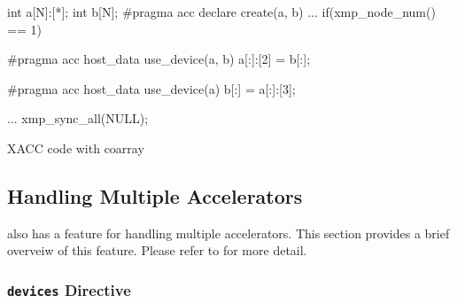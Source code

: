 \begin{myfigure}
\begin{minipage}{0.45\hsize}
\begin{center}
\end{center}
\end{minipage}
%
\begin{minipage}{0.53\hsize}
\begin{center}
\begin{XACCCexampleR}
int a[N]:[*];
int b[N];
#pragma acc declare create(a, b)
...
if(xmp_node_num() == 1){
#pragma acc host_data use_device(a, b)
  a[:]:[2] = b[:];

#pragma acc host_data use_device(a)
  b[:] = a[:]:[3];
}
...
xmp_sync_all(NULL);
\end{XACCCexampleR}
\end{center}
\end{minipage}
\caption{XACC code with coarray}\label{code:coarray}
\end{myfigure}



\subsection{Handling Multiple Accelerators}

{\XACC} also has a feature for handling multiple accelerators. This
section provides a brief overveiw of this feature. Please refer to
\cite{xacc} for more detail.

\subsubsection{{\tt devices} Directive}



